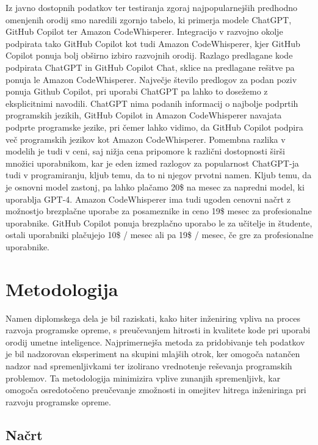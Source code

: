 \documentclass[12pt,a4paper]{book}
\begin{document}
Iz javno dostopnih podatkov ter testiranja zgoraj najpopularnejših predhodno omenjenih orodij smo naredili zgornjo tabelo, ki primerja modele ChatGPT, GitHub Copilot ter Amazon CodeWhisperer. Integracijo v razvojno okolje podpirata tako GitHub Copilot kot tudi Amazon CodeWhisperer, kjer GitHub Copilot ponuja bolj obširno izbiro razvojnih orodij. Razlago predlagane kode podpirata ChatGPT in GitHub Copilot Chat, sklice na predlagane rešitve pa ponuja le Amazon CodeWhisperer. Največje število predlogov za podan poziv ponuja Github Copilot, pri uporabi ChatGPT pa lahko to dosežemo z eksplicitnimi navodili. ChatGPT nima podanih informacij o najbolje podprtih programskih jezikih, GitHub Copilot in Amazon CodeWhisperer navajata podprte programske jezike, pri čemer lahko vidimo, da GitHub Copilot podpira več programskih jezikov kot Amazon CodeWhisperer. Pomembna razlika v modelih je tudi v ceni, saj nižja cena pripomore k različni dostopnosti širši množici uporabnikom, kar je eden izmed razlogov za popularnost ChatGPT-ja tudi v programiranju, kljub temu, da to ni njegov prvotni namen. Kljub temu, da je osnovni model zastonj, pa lahko plačamo 20\$ na mesec za napredni model, ki uporablja GPT-4. Amazon CodeWhisperer ima tudi ugoden cenovni načrt z možnostjo brezplačne uporabe za posameznike in ceno 19\$ mesec za profesionalne uporabnike. GitHub Copilot ponuja brezplačno uporabo le za učitelje in študente, ostali uporabniki plačujejo 10\$ / mesec ali pa 19\$ / mesec, če gre za profesionalne uporabnike.
\cite{github_copilot_chat}
\cite{openai_chatgpt}
\cite{saasworthy_codewhisperer}

\chapter{Metodologija}
Namen diplomskega dela je bil raziskati, kako hiter inženiring vpliva na proces razvoja programske opreme, s preučevanjem hitrosti in kvalitete kode pri uporabi orodij umetne inteligence. Najprimernejša metoda za pridobivanje teh podatkov je bil nadzorovan eksperiment na skupini mlajših otrok, ker omogoča natančen nadzor nad spremenljivkami ter izolirano vrednotenje reševanja programskih problemov. Ta metodologija minimizira vplive zunanjih spremenljivk, kar omogoča osredotočeno preučevanje zmožnosti in omejitev hitrega inženiringa pri razvoju programske opreme.

\section{Načrt}
\end{document}
